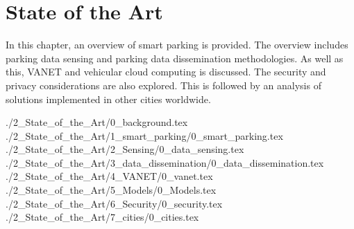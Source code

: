 \chapter{State of the Art}
In this chapter, an overview of smart parking is provided. The overview includes parking data sensing and parking data dissemination methodologies. As well as this, \ac{VANET} and vehicular cloud computing is discussed. The security and privacy considerations are also explored. This is followed by an analysis of solutions implemented in other cities worldwide.

{./2_State_of_the_Art/0_background.tex}
{./2_State_of_the_Art/1_smart_parking/0_smart_parking.tex}
{./2_State_of_the_Art/2_Sensing/0_data_sensing.tex}
{./2_State_of_the_Art/3_data_dissemination/0_data_dissemination.tex}
{./2_State_of_the_Art/4_VANET/0_vanet.tex}
{./2_State_of_the_Art/5_Models/0_Models.tex}
{./2_State_of_the_Art/6_Security/0_security.tex}
{./2_State_of_the_Art/7_cities/0_cities.tex}




